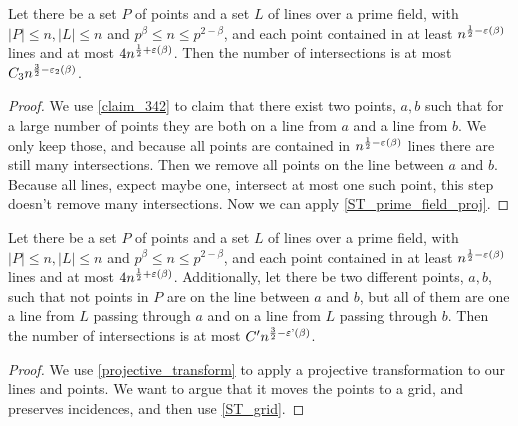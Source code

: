 \begin{theorem}
    \label{ST_prime_field_aux}
    \leanok
    Let there be a set $P$ of points and a set $L$ of lines over a prime field, 
    with $|P| \leq n, |L| \leq n$ and $p^\beta \leq n \leq p^{2 - \beta}$,
    and each point contained in at least $n^{\frac12 - \operatorname{\varepsilon}(\beta)}$ lines
    and at most $4 n^{\frac12 + \operatorname{\varepsilon}(\beta)}$.
    Then the number of intersections is at most $C_3 n^{\frac32 - \operatorname{\varepsilon_2}(\beta)}$.
\end{theorem}

\begin{proof}
    \leanok
    We use \ref{claim_342} to claim that there exist two points, $a, b$ such that for a large number of 
    points they are both on a line from $a$ and a line from $b$.
    We only keep those, and because all points are contained in $n^{\frac12 - \operatorname{\varepsilon}(\beta)}$ lines there are still many intersections.
    Then we remove all points on the line between $a$ and $b$. Because all lines, expect maybe one, intersect at most one such point,
    this step doesn't remove many intersections.
    Now we can apply \ref{ST_prime_field_proj}.
\end{proof}

\begin{theorem}
    \label{ST_prime_field_proj}
    \leanok
    Let there be a set $P$ of points and a set $L$ of lines over a prime field, 
    with $|P| \leq n, |L| \leq n$ and $p^\beta \leq n \leq p^{2 - \beta}$,
    and each point contained in at least $n^{\frac12 - \operatorname{\varepsilon}(\beta)}$ lines
    and at most $4 n^{\frac12 + \operatorname{\varepsilon}(\beta)}$. Additionally, let there be two different points,
    $a, b$, such that not points in $P$ are on the line between $a$ and $b$, but all of them are one a line from $L$
    passing through $a$ and on a line from $L$ passing through $b$.
    Then the number of intersections is at most $C' n^{\frac32 - \operatorname{\varepsilon'}(\beta)}$.
\end{theorem}

\begin{proof}
    \leanok
    We use \ref{projective_transform} to apply a projective transformation to our lines and points.
    We want to argue that it moves the points to a grid, and preserves incidences, and then use
    \ref{ST_grid}.
\end{proof}